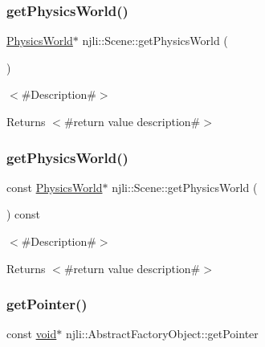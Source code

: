 \subsubsection{\texorpdfstring{get\+Physics\+World()}{getPhysicsWorld()}\hspace{0.1cm}{\footnotesize\ttfamily [1/2]}}
{\footnotesize\ttfamily \mbox{\hyperlink{classnjli_1_1_physics_world}{Physics\+World}}$\ast$ njli\+::\+Scene\+::get\+Physics\+World (\begin{DoxyParamCaption}{ }\end{DoxyParamCaption})}

$<$\#\+Description\#$>$

\begin{DoxyReturn}{Returns}
$<$\#return value description\#$>$ 
\end{DoxyReturn}
\mbox{\label{classnjli_1_1_scene_a9f348500b14218f8f4bc7f2bc3b16c63}} 
\subsubsection{\texorpdfstring{get\+Physics\+World()}{getPhysicsWorld()}\hspace{0.1cm}{\footnotesize\ttfamily [2/2]}}
{\footnotesize\ttfamily const \mbox{\hyperlink{classnjli_1_1_physics_world}{Physics\+World}}$\ast$ njli\+::\+Scene\+::get\+Physics\+World (\begin{DoxyParamCaption}{ }\end{DoxyParamCaption}) const}

$<$\#\+Description\#$>$

\begin{DoxyReturn}{Returns}
$<$\#return value description\#$>$ 
\end{DoxyReturn}
\mbox{\label{classnjli_1_1_scene_ac4ca71716ed832be357f15f8262c8448}} 
\subsubsection{\texorpdfstring{get\+Pointer()}{getPointer()}}
{\footnotesize\ttfamily const \mbox{\hyperlink{_thread_8h_af1e856da2e658414cb2456cb6f7ebc66}{void}}$\ast$ njli\+::\+Abstract\+Factory\+Object\+::get\+Pointer}

